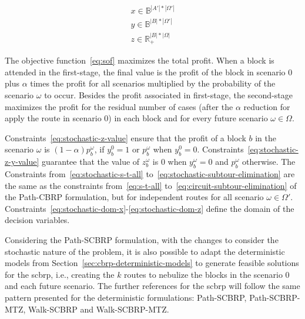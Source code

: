 \begin{align}
	                             & x \in \mathbb{B}^{|A'| * |\Omega'|}                                                                     & \label{eq:stochastic-dom-x}                                                         \\
	                             & y \in \mathbb{B}^{|B| * |\Omega'|}                                                                      & \label{eq:stochastic-dom-y}                                                         \\
	                             & z \in \mathbb{R}_{+}^{|B| * |\Omega|}                                                                   & \label{eq:stochastic-dom-z}
\end{align}

The objective function~\eqref{eq:sof} maximizes the total profit. When a block
is attended in the first-stage, the final value is the profit of the block in
scenario $0$ plus $\alpha$ times the profit for all scenarios multiplied by the
probability of the scenario $\omega$ to occur. Besides the profit associated in
first-stage, the second-stage maximizes the profit for the residual number of
cases (after the $\alpha$ reduction for apply the route in scenario $0$) in each
block and for every future scenario $\omega \in \Omega$.

Constraints~\eqref{eq:stochastic-z-value} ensure that the profit of a block $b$
in the scenario $\omega$ is $(1 - \alpha) p_{b}^{\omega}$, if $y_{b}^{0} = 1$ or
$p_{b}^{\omega}$ when $y_{b}^{0} = 0$.
Constraints~\eqref{eq:stochastic-z-y-value}  guarantee that the value of
$z_{b}^{\omega}$ is $0$ when $y_{b}^{\omega} = 0$ and $p_{b}^{\omega}$
otherwise. The Constraints from~\eqref{eq:stochastic-s-t-all}
to~\eqref{eq:stochastic-subtour-elimination} are the same as the constraints
from~\eqref{eq:s-t-all} to~\eqref{eq:circuit-subtour-elimination} of the
Path-CBRP formulation, but for independent routes for all scenario $\omega \in
	\Omega'$. Constraints~\eqref{eq:stochastic-dom-x}-\eqref{eq:stochastic-dom-z}
define the domain of the decision variables.

Considering the Path-SCBRP formulation, with the changes to consider the
stochastic nature of the problem, it is also possible to adapt the deterministic
models from Section~\ref{sec:cbrp-deterministic-models} to generate feasible
solutions for the \gls{scbrp}, i.e., creating the $k$ routes to nebulize the
blocks in the scenario $0$ and each future scenario. The further references for
the \gls{scbrp} will follow the same pattern presented for the deterministic
formulations: Path-SCBRP, Path-SCBRP-MTZ, Walk-SCBRP and Walk-SCBRP-MTZ.

